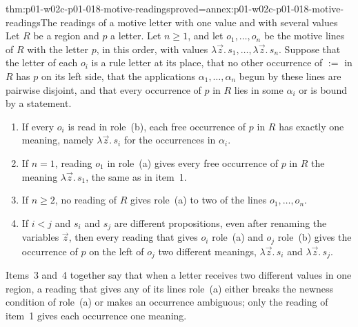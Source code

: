 \begin{hblemma}{thm:p01-w02c-p01-018-motive-readings}{proved=annex:p01-w02c-p01-018-motive-readings}{The readings of a motive letter with one value and with several values}
Let \(R\) be a region and \(p\) a letter.  Let \(n\geq1\), and let
\(o_1,\ldots,o_n\) be the motive lines of \(R\) with the letter \(p\), in
this order,
with values \(\lambda\vec z.\,s_1,\ldots,\lambda\vec z.\,s_n\).  Suppose
that the letter of each \(o_i\) is a rule letter at its place, that no
other occurrence of \(:=\) in \(R\) has \(p\) on its left side, that the
applications \(\alpha_1,\ldots,\alpha_n\) begun by these lines are
pairwise disjoint, and that every occurrence of \(p\) in \(R\) lies in
some \(\alpha_i\) or is bound by a statement.
\begin{enumerate}
  \item If every \(o_i\) is read in role~(b), each free occurrence of
  \(p\) in \(R\) has exactly one meaning, namely
  \(\lambda\vec z.\,s_i\) for the occurrences in \(\alpha_i\).
  \item If \(n=1\), reading \(o_1\) in role~(a) gives every free
  occurrence of \(p\) in \(R\) the meaning \(\lambda\vec z.\,s_1\), the
  same as in item~1.
  \item If \(n\geq2\), no reading of \(R\) gives role~(a) to two of the
  lines \(o_1,\ldots,o_n\).
  \item If \(i<j\) and \(s_i\) and \(s_j\) are different propositions,
  even after renaming the variables \(\vec z\), then every reading that
  gives \(o_i\) role~(a) and \(o_j\) role~(b) gives the occurrence of
  \(p\) on the left of \(o_j\) two different meanings,
  \(\lambda\vec z.\,s_i\) and \(\lambda\vec z.\,s_j\).
\end{enumerate}
\end{hblemma}

Items~3 and~4 together say that when a letter receives two different
values in one region, a reading that gives any of its lines role~(a)
either breaks the newness condition of role~(a) or makes an occurrence
ambiguous; only the reading of item~1 gives each occurrence one meaning.

